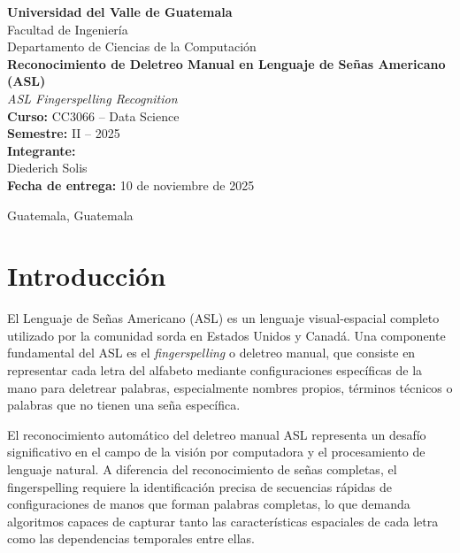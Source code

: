 \documentclass[12pt,a4paper]{article}
\begin{document}
\begin{titlepage}
    \centering
    \vspace*{1cm}
    
    {\Large\bfseries Universidad del Valle de Guatemala}\\[0.5cm]
    {\large Facultad de Ingeniería}\\[0.3cm]
    {\large Departamento de Ciencias de la Computación}\\[2cm]
    
    {\huge\bfseries Reconocimiento de Deletreo Manual en Lenguaje de Señas Americano (ASL)}\\[0.5cm]
    {\Large\textit{ASL Fingerspelling Recognition}}\\[2cm]
    
    {\large\bfseries Curso:} CC3066 – Data Science\\[0.3cm]
    {\large\bfseries Semestre:} II – 2025\\[2cm]
    
    {\large\bfseries Integrante:}\\[0.5cm]
    {\large Diederich Solis}\\[2cm]
    
    {\large\bfseries Fecha de entrega:} 10 de noviembre de 2025\\[2cm]
    
    \vfill
    
    {\large Guatemala, Guatemala}
\end{titlepage}

\newpage
\tableofcontents
\newpage

\section{Introducción}

El Lenguaje de Señas Americano (ASL) es un lenguaje visual-espacial completo utilizado por la comunidad sorda en Estados Unidos y Canadá. Una componente fundamental del ASL es el \textit{fingerspelling} o deletreo manual, que consiste en representar cada letra del alfabeto mediante configuraciones específicas de la mano para deletrear palabras, especialmente nombres propios, términos técnicos o palabras que no tienen una seña específica.

El reconocimiento automático del deletreo manual ASL representa un desafío significativo en el campo de la visión por computadora y el procesamiento de lenguaje natural. A diferencia del reconocimiento de señas completas, el fingerspelling requiere la identificación precisa de secuencias rápidas de configuraciones de manos que forman palabras completas, lo que demanda algoritmos capaces de capturar tanto las características espaciales de cada letra como las dependencias temporales entre ellas.
\end{document}
